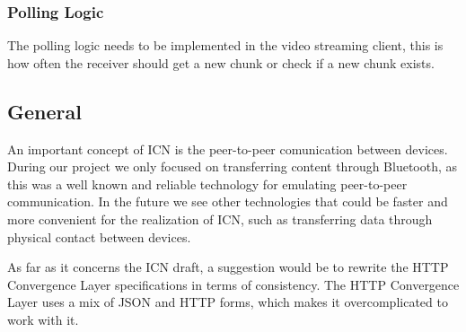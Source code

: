 \subsubsection{Polling Logic}

The polling logic needs to be implemented in the video streaming client, this is how often the receiver should get 
a new chunk or check if a new chunk exists.  

\subsection{General}

An important concept of ICN is the peer-to-peer comunication between devices. 
During our project we only focused on transferring content
through Bluetooth, as this was a well known and reliable technology for emulating peer-to-peer communication.
In the future we see other technologies that could be faster and more convenient for the realization of ICN,
such as transferring data through physical contact between devices.

As far as it concerns the ICN draft, a suggestion would be to rewrite the HTTP Convergence Layer specifications
in terms of consistency. The HTTP Convergence Layer uses a mix of JSON and HTTP forms, which makes it
overcomplicated to work with it.
